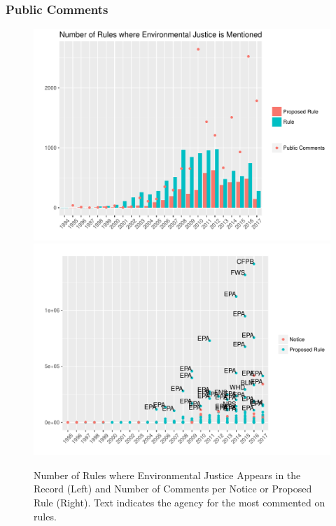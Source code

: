\documentclass[10pt]{beamer}
\begin{document}
\begin{frame}
\frametitle{Public Comments}
\begin{figure}
\caption{Number of Rules where Environmental Justice Appears in the Record (Left) and Number of Comments per Notice or Proposed Rule (Right). Text indicates the agency for the most commented on rules.}
\includegraphics[width = \textwidth/2]{eandj_hist.pdf}
\includegraphics[width =\textwidth/2]{eandj_comments.pdf}
\end{figure}
\end{frame}
\end{document}
